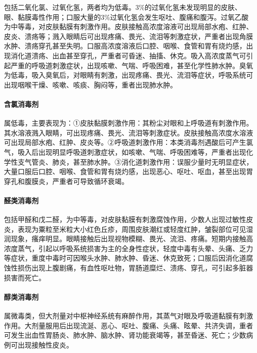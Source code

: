 包括二氧化氯、过氧化氢，两者均为低毒。3\%的过氧化氢未发现明显的皮肤、眼、黏膜毒性作用；口服大量的3\%过氧化氢会发生呕吐、腹痛和腹泻。过氧乙酸为中等毒，对皮肤黏膜有刺激作用。皮肤接触高浓度溶液可出现局部水疱、红肿、皮炎、溃疡等；溅入眼睛后可出现疼痛、畏光、流泪等刺激症状，严重者出现角膜水肿、溃疡穿孔甚至失明。口服高浓度溶液后口腔、咽喉、食管和胃有烧灼感，出现消化道溃疡、出血甚至穿孔，严重者可昏迷、抽搐、休克。吸入高浓度蒸气可引起严重的呼吸道刺激症状，出现咳嗽、气喘、呼吸困难，甚至化学性肺水肿。臭氧为低毒，吸入臭氧后，对眼睛有刺激，出现疼痛、畏光、流泪等症状，呼吸系统可出现咽喉干燥、咳嗽、咳痰、胸闷等，重者出现肺水肿。

\paragraph{含氯消毒剂}

属低毒，主要表现为：①皮肤黏膜刺激作用：其粉尘对眼和上呼吸道有刺激作用。其水溶液溅入眼睛，可出现疼痛、畏光、流泪等刺激症状。皮肤接触高浓度水溶液可出现局部水疱、红肿、皮炎等。②呼吸道刺激作用：本类消毒剂遇酸后可产生氯气，吸入后出现明显呼吸道刺激症状，如咳嗽、气喘、呼吸困难等，严重者出现化学性支气管炎、肺炎，甚至肺水肿。③消化道刺激作用：误服少量时无明显症状，大量口服后口腔、咽喉、食管和胃有烧灼感，出现恶心、呕吐、呕血，甚至出现胃穿孔和腹膜炎，严重者可导致循环衰竭。

\paragraph{醛类消毒剂}

包括甲醛和戊二醛，为中等毒，对皮肤黏膜有刺激腐蚀作用，少数人出现过敏性皮炎，表现为粟粒至米粒大小红色丘疹，周围皮肤潮红或轻度红肿，皱裂部位可见湿润现象，瘙痒明显。眼睛接触后出现视物模糊、畏光、流泪、疼痛。短期内接触高浓度蒸气，引起以呼吸系统损害为主的全身性症状，轻度中毒有头晕、头痛、乏力等症状，重度中毒时可因喉头水肿、肺水肿、昏迷、休克致死；口服后因消化道腐蚀性损伤出现上腹剧痛，有血性呕吐物，胃肠道糜烂、溃疡、穿孔，可引起多脏器损害而死亡。

\paragraph{醇类消毒剂}

属微毒类，但大剂量对中枢神经系统有麻醉作用，其蒸气对眼及呼吸道黏膜有刺激作用。大剂量服用后出现流涎、恶心、呕吐、腹痛、头痛、眩晕、共济失调，重者可发生出血性胃肠炎、肺水肿、脑水肿、肾功能衰竭等，甚至昏迷、死亡；少数病例可出现接触性皮炎。

